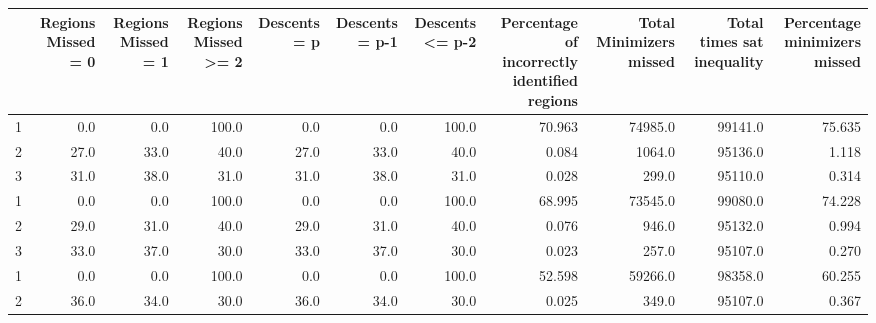 \begin{tabular}{lrrrrrrrrrr}
\toprule
{} &  Regions Missed = 0 &  Regions Missed = 1 &  Regions Missed >= 2 &  Descents = p &  Descents = p-1 &  Descents <= p-2 &  Percentage of incorrectly identified regions &  Total Minimizers missed &  Total times sat inequality &  Percentage minimizers missed \\
\midrule
1 &                 0.0 &                 0.0 &                100.0 &           0.0 &             0.0 &            100.0 &                                        70.963 &                  74985.0 &                     99141.0 &                        75.635 \\
2 &                27.0 &                33.0 &                 40.0 &          27.0 &            33.0 &             40.0 &                                         0.084 &                   1064.0 &                     95136.0 &                         1.118 \\
3 &                31.0 &                38.0 &                 31.0 &          31.0 &            38.0 &             31.0 &                                         0.028 &                    299.0 &                     95110.0 &                         0.314 \\
1 &                 0.0 &                 0.0 &                100.0 &           0.0 &             0.0 &            100.0 &                                        68.995 &                  73545.0 &                     99080.0 &                        74.228 \\
2 &                29.0 &                31.0 &                 40.0 &          29.0 &            31.0 &             40.0 &                                         0.076 &                    946.0 &                     95132.0 &                         0.994 \\
3 &                33.0 &                37.0 &                 30.0 &          33.0 &            37.0 &             30.0 &                                         0.023 &                    257.0 &                     95107.0 &                         0.270 \\
1 &                 0.0 &                 0.0 &                100.0 &           0.0 &             0.0 &            100.0 &                                        52.598 &                  59266.0 &                     98358.0 &                        60.255 \\
2 &                36.0 &                34.0 &                 30.0 &          36.0 &            34.0 &             30.0 &                                         0.025 &                    349.0 &                     95107.0 &                         0.367 \\

\end{tabular}
